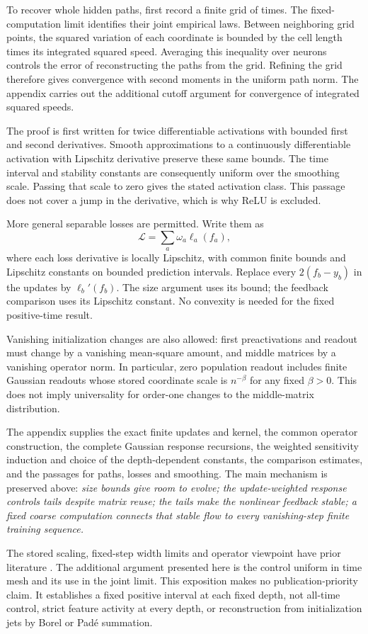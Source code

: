 To recover whole hidden paths, first record a finite grid of times. The
fixed-computation limit identifies their joint empirical laws. Between
neighboring grid points, the squared variation of each coordinate is bounded
by the cell length times its integrated squared speed. Averaging this
inequality over neurons controls the error of reconstructing the paths from
the grid. Refining the grid therefore gives convergence with second moments
in the uniform path norm. The appendix carries out the additional cutoff
argument for convergence of integrated squared speeds.

The proof is first written for twice differentiable activations with bounded
first and second derivatives. Smooth approximations to a continuously
differentiable activation with Lipschitz derivative preserve these same
bounds. The time interval and stability constants are consequently uniform
over the smoothing scale. Passing that scale to zero gives the stated
activation class. This passage does not cover a jump in the derivative,
which is why ReLU is excluded.

More general separable losses are permitted. Write them as
\[
\mathcal L=\sum_a\omega_a\ell_a(f_a),
\]
where each loss derivative is locally Lipschitz, with common finite bounds
and Lipschitz constants on bounded prediction intervals. Replace every
$2(f_b-y_b)$ in the updates by $\ell_b'(f_b)$. The size argument uses its
bound; the feedback comparison uses its Lipschitz constant. No convexity is
needed for the fixed positive-time result.

Vanishing initialization changes are also allowed: first preactivations and
readout must change by a vanishing mean-square amount, and middle matrices
by a vanishing operator norm. In particular, zero population readout includes
finite Gaussian readouts whose stored coordinate scale is $n^{-\beta}$ for
any fixed $\beta>0$. This does not imply universality for order-one changes
to the middle-matrix distribution.

The appendix supplies the exact finite updates and kernel, the common
operator construction, the complete Gaussian response recursions, the
weighted sensitivity induction and choice of the depth-dependent constants,
the comparison estimates, and the passages for paths, losses and smoothing.
The main mechanism is preserved above: \emph{size bounds give room to evolve;
the update-weighted response controls tails despite matrix reuse; the tails
make the nonlinear feedback stable; a fixed coarse computation connects
that stable flow to every vanishing-step finite training sequence.}

The stored scaling, fixed-step width limits and operator viewpoint have prior
literature \cite{TP3,TP4,TP4b,TP5}. The additional argument presented here
is the control uniform in time mesh and its use in the joint limit. This
exposition makes no publication-priority claim. It establishes a fixed
positive interval at each fixed depth, not all-time control, strict feature
activity at every depth, or reconstruction from initialization jets by Borel
or Pad\'e summation.
